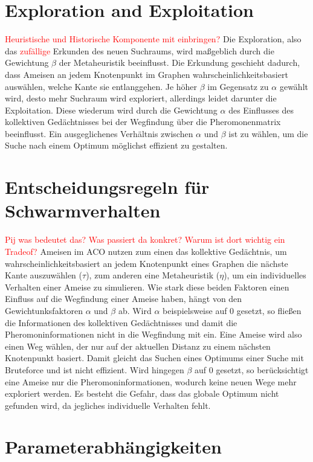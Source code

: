 \section{Exploration and Exploitation}

\textcolor{red}{Heuristische und Historische Komponente mit einbringen?}
Die Exploration, also das \textcolor{red}{zufällige} Erkunden des neuen 
Suchraums, wird maßgeblich durch die Gewichtung $\beta$ der Metaheuristik 
beeinflusst. Die Erkundung geschieht dadurch, dass Ameisen an jedem Knotenpunkt 
im Graphen wahrscheinlichkeitsbasiert auswählen, welche Kante sie entlanggehen. 
Je höher $\beta$ im Gegensatz zu $\alpha$ gewählt wird, desto mehr Suchraum wird 
exploriert, allerdings leidet darunter die Exploitation.
Diese wiederum wird durch die Gewichtung $\alpha$ des Einflusses des
kollektiven Gedächtnisses bei der Wegfindung über die Pheromonenmatrix
beeinflusst.
Ein ausgeglichenes Verhältnis zwischen $\alpha$ und $\beta$ ist zu wählen, um
die Suche nach einem Optimum möglichst effizient zu gestalten.

\section{Entscheidungsregeln für Schwarmverhalten}

\textcolor{red}{Pij was bedeutet das? Was passiert da konkret? Warum ist dort 
wichtig ein Tradeof?}
Ameisen im ACO nutzen zum einen das kollektive Gedächtnis, um
wahrscheinlichkeitsbasiert an jedem Knotenpunkt eines Graphen die nächste
Kante auszuwählen ($\tau$), zum anderen eine Metaheuristik ($\eta$), um ein
individuelles Verhalten einer Ameise zu simulieren. Wie stark diese beiden
Faktoren einen Einfluss auf die Wegfindung einer Ameise haben, hängt von
den Gewichtunksfaktoren $\alpha$ und $\beta$ ab. Wird $\alpha$ beispielsweise
auf 0 gesetzt, so fließen die Informationen des kollektiven Gedächtnisses und
damit die Pheromoninformationen nicht in die Wegfindung mit ein. Eine Ameise
wird also einen Weg wählen, der nur auf der aktuellen Distanz zu einem nächsten
Knotenpunkt basiert. Damit gleicht das Suchen eines Optimums einer Suche mit
Bruteforce und ist nicht effizient. Wird hingegen $\beta$ auf 0 gesetzt, so
berücksichtigt eine Ameise nur die Pheromoninformationen, wodurch keine neuen
Wege mehr exploriert werden. Es besteht die Gefahr, dass das globale Optimum
nicht gefunden wird, da jegliches individuelle Verhalten fehlt.

\section{Parameterabhängigkeiten}

